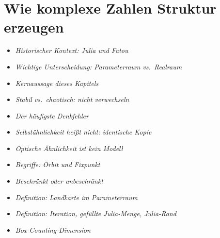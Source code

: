 \section{Wie komplexe Zahlen Struktur erzeugen}

\begin{HistoryBox}
	
	\begin{itemize}
		\item \emph{Historischer Kontext: Julia und Fatou}\dotfill \pageref{box:julia}
	\end{itemize}
\end{HistoryBox}

\begin{NoteBox}[Hinweisboxen]
	
	\begin{itemize}
		\item \emph{Wichtige Unterscheidung: \newline Parameterraum vs.\ Realraum}\dotfill \pageref{box:unterscheidung}
		\item \emph{Kernaussage dieses Kapitels}\dotfill \pageref{box:kernaussage}
	\end{itemize}
\end{NoteBox}

\begin{DidacticBox}[Didaktikboxen]
	\begin{itemize}
		\item \emph{Stabil vs.\ chaotisch: nicht verwechseln}\dotfill \pageref{box:stabil}
		\item \emph{Der häufigste Denkfehler}\dotfill \pageref{box:denkfehler}
		\item \emph{Selbstähnlichkeit heißt nicht: identische Kopie}\dotfill \pageref{box:kopie}
		\item \emph{Optische Ähnlichkeit ist kein Modell}\dotfill \pageref{box:optisch}
	\end{itemize}
\end{DidacticBox}

\begin{MathBox}
	
	\begin{itemize}
		\item \emph{Begriffe: Orbit und Fixpunkt}\dotfill \pageref{box:orbit}
		\item \emph{Beschränkt oder unbeschränkt}\dotfill \pageref{box:beschraenkt}
		\item \emph{Definition: Landkarte im Parameterraum}\dotfill \pageref{box:landkarte}
		\item \emph{Definition: Iteration, gefüllte \newline Julia-Menge, Julia-Rand}\dotfill \pageref{box:iteration}
		\item \emph{Box-Counting-Dimension}\dotfill \pageref{box:boxcounting}
	\end{itemize}
\end{MathBox}

